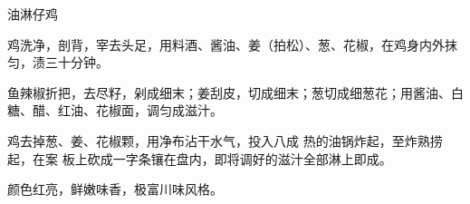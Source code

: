 \begin{recipe}{油淋仔鸡}

\ingredients


\preparation

\step 鸡洗净，剖背，宰去头足，用料酒、酱油、姜（拍松）、葱、花椒，在鸡身内外抹
匀，渍三十分钟。

\step 鱼辣椒折把，去尽籽，剁成细末；姜刮皮，切成细末；葱切成细葱花；用酱油、白
糖、醋、红油、花椒面，调匀成滋汁。

鸡去掉葱、姜、花椒颗，用净布沾干水气，投入八成 热的油锅炸起，至炸熟捞起，在案
板上砍成一字条镶在盘内，即将调好的滋汁全部淋上即成。

\features

颜色红亮，鲜嫩味香，极富川味风格。

\end{recipe}

